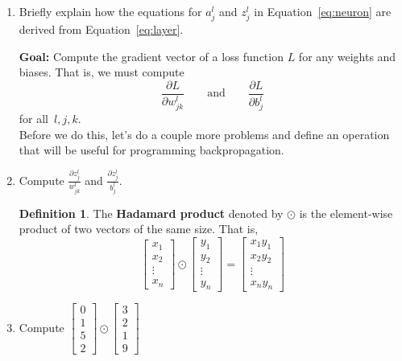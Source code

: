 \documentclass[12pt]{amsart}
\theoremstyle{definition}
\newtheorem*{definition}{Definition}
\begin{document}
\begin{enumerate}[itemsep=2.5em,leftmargin=0pt]
\item Briefly explain how the equations for $a^l_j$ and $z^l_j$ in Equation~\ref{eq:neuron} are derived from Equation~\ref{eq:layer}. 

\vspace{2.5em}

\noindent \textbf{Goal:} Compute the gradient vector of a loss function $L$ for any weights and biases. That is, we must compute 
    \[ \frac{\partial L}{\partial w^l_{jk}} \qquad \text{and} \qquad \frac{\partial L}{\partial b^l_{j}} \] 
for all~$l,j,k$. \\

\noindent Before we do this, let's do a couple more problems and define an operation that will be useful for programming backpropagation.

\vspace{-1.5em}

\item Compute $\displaystyle \frac{\partial z^l_j}{w^l_{jk}}$ and $\displaystyle \frac{\partial z^l_j}{b^l_{j}}$.

\vspace{2em}

\begin{definition}The \textbf{Hadamard product} denoted by $\odot$ is the element-wise product of two vectors of the same size. That is,
    \[
        \begin{bmatrix} x_1\\ x_2 \\ \vdots \\ x_n \end{bmatrix}
            \odot
        \begin{bmatrix} y_1\\ y_2 \\ \vdots \\ y_n \end{bmatrix}
        = \begin{bmatrix} x_1y_1\\ x_2y_2 \\ \vdots \\ x_ny_n \end{bmatrix}
    \]
\end{definition}

\vspace{-1.5em}

\item Compute 
    \(
        \begin{bmatrix} 0\\ 1 \\ 5 \\ 2 \end{bmatrix}
            \odot
        \begin{bmatrix} 3\\ 2 \\ 1 \\ 9 \end{bmatrix}
    \)


\end{enumerate}
\end{document}
